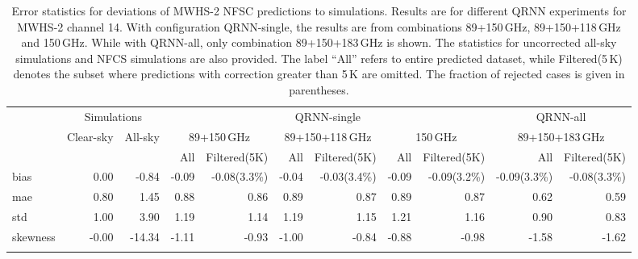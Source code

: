 \documentclass[amt, manuscript]{copernicus}
\begin{document}
\begin{table}[t]
	\caption{Error statistics for deviations of MWHS-2 NFSC predictions to simulations. Results are for different QRNN experiments for MWHS-2 channel 14. With configuration QRNN-single, the results are from combinations 89+150\,GHz, 89+150+118\,GHz and 150\,GHz. While with QRNN-all, only combination 89+150+183\,GHz is shown. The statistics for uncorrected all-sky simulations and NFCS simulations are also provided. The label ``All'' refers to entire predicted dataset, while Filtered(5\,K) denotes the subset where predictions with correction greater than 5\,K are omitted. The fraction of rejected cases is given in parentheses. }
	\label{tab:error_statistics_mwhs_14}
	\begin{tabular}{lrr|rr|rr|rr|rr}
		\tophline
		&\multicolumn{2}{c|}{Simulations}& \multicolumn{6}{c|}{QRNN-single} & \multicolumn{2}{c}{QRNN-all}\\
		\cline{2-11}
		&   Clear-sky &   All-sky &  \multicolumn{2}{c|}{89+150\,GHz} & \multicolumn{2}{c|}{89+150+118\,GHz} & \multicolumn{2}{c|}{150\,GHz} & \multicolumn{2}{c}{89+150+183\,GHz}\\
		&			   &			& All & Filtered(5K) & All & Filtered(5K) & All & Filtered(5K)  & All & Filtered(5K)\\
		\middlehline
		bias     &  0.00 &  -0.84 & -0.09 & -0.08(3.3\%) & -0.04 & -0.03(3.4\%) & -0.09 & -0.09(3.2\%) & -0.09(3.3\%) & -0.08(3.3\%)  \\
		mae      &  0.80 &   1.45 &  0.88 &  0.86 &  0.89 &  0.87 &  0.89 &  0.87 &  0.62 &  0.59\\
		std      &  1.00 &   3.90 &  1.19 &  1.14 &  1.19 &  1.15 &  1.21 &  1.16 &  0.90 &  0.83\\
		skewness & -0.00 & -14.34 & -1.11 & -0.93 & -1.00 & -0.84 & -0.88 & -0.98 & -1.58 & -1.62\\
		\bottomhline
	\end{tabular}
\end{table}
\end{document}
